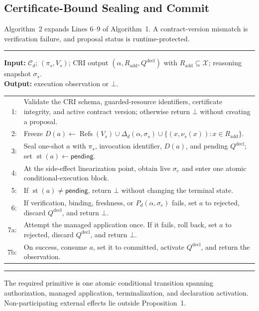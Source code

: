 \subsection{Certificate-Bound Sealing and Commit}
Algorithm~2 expands Lines 6--9 of Algorithm~1. A contract-version mismatch is verification failure, and proposal status is runtime-protected.
\begin{center}
\begin{minipage}{0.94\textwidth}
\hrule
{}
\normalsize
\noindent\textbf{Input:} $\mathcal C_d$; $(\pi_s,V_s)$; CRI output $(\alpha,R_{\mathrm{add}},Q^{\mathrm{decl}})$ with $R_{\mathrm{add}}\subseteq\mathcal X$; reasoning snapshot $\sigma_s$.\\
\noindent\textbf{Output:} execution observation or $\bot$.
\renewcommand{\arraystretch}{1.10}
\begin{tabularx}{\linewidth}{@{}r@{\hspace{0.55em}}X@{}}
1: & Validate the CRI schema, guarded-resource identifiers, certificate integrity, and active contract version; otherwise return $\bot$ without creating a proposal. \\
2: & Freeze $D(a)\leftarrow\operatorname{Refs}(V_s)\cup\Delta_d(\alpha,\sigma_s)\cup\{(x,\nu_s(x)):x\in R_{\mathrm{add}}\}$. \\
3: & Seal one-shot $a$ with $\pi_s$, invocation identifier, $D(a)$, and pending $Q^{\mathrm{decl}}$; set $\operatorname{st}(a)\leftarrow\mathsf{pending}$. \\
4: & At the side-effect linearization point, obtain live $\sigma_e$ and enter one atomic conditional-execution block. \\
5: & If $\operatorname{st}(a)\ne\mathsf{pending}$, return $\bot$ without changing the terminal state. \\
6: & If verification, binding, freshness, or $P_d(\alpha,\sigma_e)$ fails, set $a$ to rejected, discard $Q^{\mathrm{decl}}$, and return $\bot$. \\
7a: & Attempt the managed application once. If it fails, roll back, set $a$ to rejected, discard $Q^{\mathrm{decl}}$, and return $\bot$. \\
7b: & On success, consume $a$, set it to committed, activate $Q^{\mathrm{decl}}$, and return the observation. \\
\end{tabularx}
\hrule
\end{minipage}
\end{center}
The required primitive is one atomic conditional transition spanning authorization, managed application, terminalization, and declaration activation. Non-participating external effects lie outside Proposition~1.
